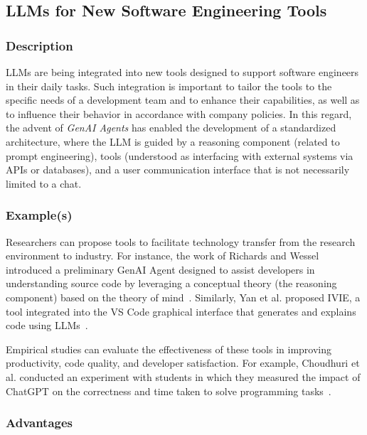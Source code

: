 \documentclass[11pt]{article}
\begin{document}
\subsection{LLMs for New Software Engineering Tools}

\subsubsection{Description}

LLMs are being integrated into new tools designed to support software engineers in their daily tasks.
Such integration is important to tailor the tools to the specific needs of a development team and to enhance their capabilities, as well as to influence their behavior in accordance with company policies.
In this regard, the advent of \textit{GenAI Agents} has enabled the development of a standardized architecture, where the LLM is guided by a reasoning component (related to prompt engineering), tools (understood as interfacing with external systems via APIs or databases), and a user communication interface that is not necessarily limited to a chat.

\subsubsection{Example(s)}

Researchers can propose tools to facilitate technology transfer from the research environment to industry. 
For instance, the work of Richards and Wessel introduced a preliminary GenAI Agent designed to assist developers in understanding source code by leveraging a conceptual theory (the reasoning component) based on the theory of mind~\cite{DBLP:conf/icsm/RichardsW24}. 
Similarly, Yan et al. proposed IVIE, a tool integrated into the VS Code graphical interface that generates and explains code using LLMs~\cite{DBLP:conf/chi/YanHWH24}.

Empirical studies can evaluate the effectiveness of these tools in improving productivity, code quality, and developer satisfaction. 
For example, Choudhuri et al. conducted an experiment with students in which they measured the impact of ChatGPT on the correctness and time taken to solve programming tasks~\cite{DBLP:conf/icse/ChoudhuriLSGS24}.

\subsubsection{Advantages}
\end{document}
